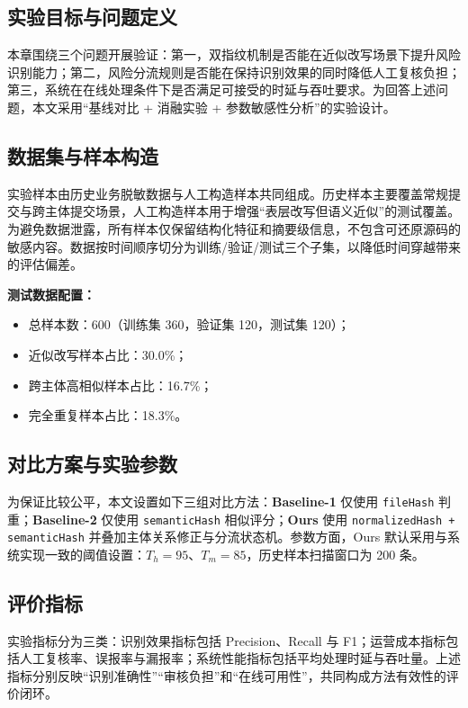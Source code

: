 \documentclass[UTF8,a4paper,zihao=5]{ctexart}
\begin{document}
\subsection{实验目标与问题定义}
本章围绕三个问题开展验证：第一，双指纹机制是否能在近似改写场景下提升风险识别能力；第二，风险分流规则是否能在保持识别效果的同时降低人工复核负担；第三，系统在在线处理条件下是否满足可接受的时延与吞吐要求。为回答上述问题，本文采用“基线对比 + 消融实验 + 参数敏感性分析”的实验设计。

\subsection{数据集与样本构造}
实验样本由历史业务脱敏数据与人工构造样本共同组成。历史样本主要覆盖常规提交与跨主体提交场景，人工构造样本用于增强“表层改写但语义近似”的测试覆盖。为避免数据泄露，所有样本仅保留结构化特征和摘要级信息，不包含可还原源码的敏感内容。数据按时间顺序切分为训练/验证/测试三个子集，以降低时间穿越带来的评估偏差。

\noindent\textbf{测试数据配置：}
\begin{itemize}[leftmargin=2em]
  \item 总样本数：600（训练集 360，验证集 120，测试集 120）；
  \item 近似改写样本占比：30.0\%；
  \item 跨主体高相似样本占比：16.7\%；
  \item 完全重复样本占比：18.3\%。
\end{itemize}

\subsection{对比方案与实验参数}
为保证比较公平，本文设置如下三组对比方法：\textbf{Baseline-1} 仅使用 \texttt{fileHash} 判重；\textbf{Baseline-2} 仅使用 \texttt{semanticHash} 相似评分；\textbf{Ours} 使用 \texttt{normalizedHash + semanticHash} 并叠加主体关系修正与分流状态机。参数方面，Ours 默认采用与系统实现一致的阈值设置：$T_h=95$、$T_m=85$，历史样本扫描窗口为 200 条。

\subsection{评价指标}
实验指标分为三类：识别效果指标包括 Precision、Recall 与 F1；运营成本指标包括人工复核率、误报率与漏报率；系统性能指标包括平均处理时延与吞吐量。上述指标分别反映“识别准确性”“审核负担”和“在线可用性”，共同构成方法有效性的评价闭环。
\end{document}

